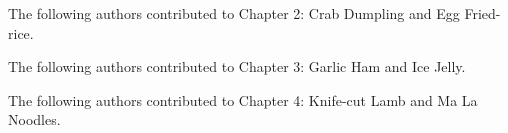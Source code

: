 \noindent The following authors contributed to Chapter 2: Crab Dumpling and Egg Fried-rice.

\noindent The following authors contributed to Chapter 3: Garlic Ham and Ice Jelly.

\noindent The following authors contributed to Chapter 4: Knife-cut Lamb and Ma La Noodles. 
